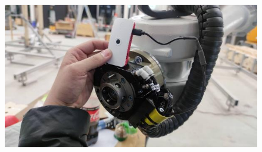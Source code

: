 \documentclass[11pt]{book}
\begin{document}
\begin{figure}[H]
\includegraphics[width=15.92cm,height=8.96cm]{./images/image75.jpeg}
\end{figure}
\end{document}
